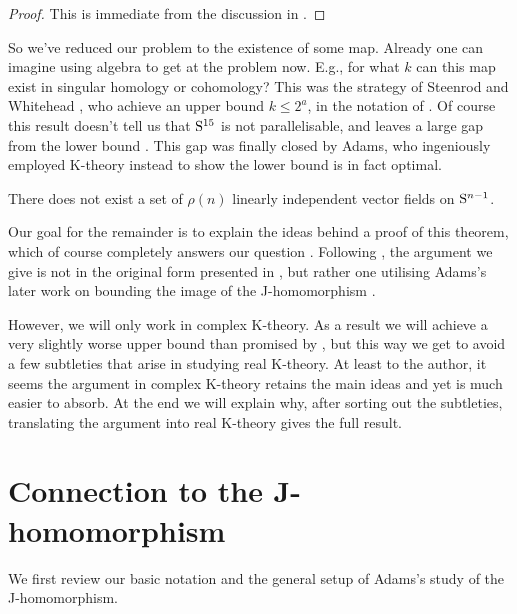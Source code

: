 \begin{proof}
  This is immediate from the discussion in .
\end{proof}

So we've reduced our problem to the existence of some map. Already one
can imagine using algebra to get at the problem now. E.g., for what
$k$ can this map exist in singular homology or cohomology?  This was
the strategy of Steenrod and Whitehead \cite{steenrod-vfields}, who
achieve an upper bound $k \le 2^a$, in the notation of
. Of course this result doesn't tell us that
$\S^{15}$ is not parallelisable, and leaves a large gap from the lower
bound . This gap was finally closed by Adams,
who ingeniously employed K-theory instead to show the lower bound
 is in fact optimal.

\begin{theorem}
  \label{vfield-upper-bound}
  There does not exist a set of $\rho(n)$ linearly independent vector
  fields on $\S^{n-1}$.
\end{theorem}

Our goal for the remainder is to explain the ideas behind a proof of
this theorem, which of course completely answers our question
. Following \cite{miller-vfields}, the argument we
give is not in the original form presented in \cite{adams-vfields},
but rather one utilising Adams's later work on bounding the image of
the J-homomorphism \cite{adams-J-II}.

However, we will only work in complex K-theory. As a result we will
achieve a very slightly worse upper bound than promised by
, but this way we get to avoid a few
subtleties that arise in studying real K-theory. At least to the
author, it seems the argument in complex K-theory retains the main
ideas and yet is much easier to absorb. At the end we will explain
why, after sorting out the subtleties, translating the argument into
real K-theory gives the full result.


\section{Connection to the J-homomorphism}

We first review our basic notation and the general setup of Adams's
study of the J-homomorphism.

